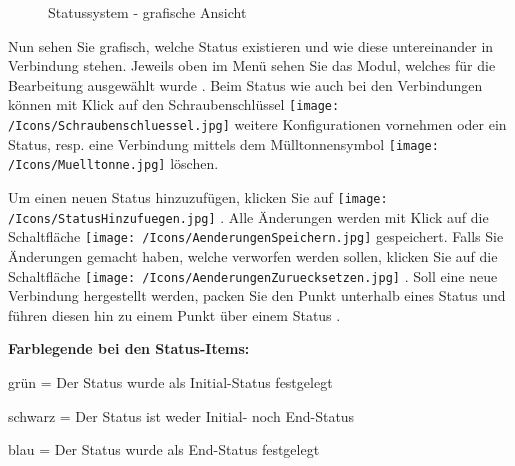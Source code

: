 \begin{figure}[H]
\caption{Statussystem - grafische Ansicht}
\end{figure}

Nun sehen Sie grafisch, welche Status existieren und wie diese untereinander in Verbindung stehen. Jeweils oben im Menü sehen Sie das Modul, welches für die Bearbeitung ausgewählt wurde .
Beim Status wie auch bei den Verbindungen können mit Klick auf den Schraubenschlüssel \texttt{[image: /Icons/Schraubenschluessel.jpg]}  weitere Konfigurationen vornehmen oder ein Status, resp. eine Verbindung mittels dem Mülltonnensymbol \texttt{[image: /Icons/Muelltonne.jpg]}  löschen.

\vspace{\baselineskip}

Um einen neuen Status hinzuzufügen, klicken Sie auf \texttt{[image: /Icons/StatusHinzufuegen.jpg]} . Alle Änderungen werden mit Klick auf die Schaltfläche \texttt{[image: /Icons/AenderungenSpeichern.jpg]}  gespeichert. Falls Sie Änderungen gemacht haben, welche verworfen werden sollen, klicken Sie auf die Schaltfläche \texttt{[image: /Icons/AenderungenZuruecksetzen.jpg]} . Soll eine neue Verbindung hergestellt werden, packen Sie den Punkt unterhalb eines Status  und führen diesen hin zu einem Punkt über einem Status .

\vspace{\baselineskip}

\textbf{Farblegende bei den Status-Items:}
\begin{compactitem}
	\item {\color{ForestGreen} grün} = Der Status wurde als Initial-Status festgelegt
	\item schwarz = Der Status ist weder Initial- noch End-Status
	\item {\color{ProcessBlue} blau} = Der Status wurde als End-Status festgelegt
\end{compactitem}

\pagebreak

